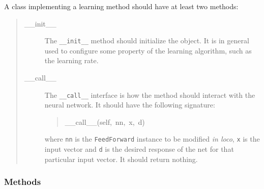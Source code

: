 A class implementing a learning method should have at least two methods:
%
\begin{quote}
%
\begin{description}
\item[{\_\_init\_\_}] \leavevmode 
The \texttt{\_\_init\_\_} method should initialize the object. It is in general
used to configure some property of the learning algorithm, such as the
learning rate.

\item[{\_\_call\_\_}] \leavevmode 
The \texttt{\_\_call\_\_} interface is how the method should interact with the
neural network. It should have the following signature:
%
\begin{quote}{\ttfamily \raggedright \noindent
\_\_call\_\_(self,~nn,~x,~d)
}
\end{quote}

where \texttt{nn} is the \texttt{FeedForward} instance to be modified \emph{in loco},
\texttt{x} is the input vector and \texttt{d} is the desired response of the net
for that particular input vector. It should return nothing.

\end{description}

\end{quote}


  \subsubsection{Methods}

    \label{peach:nn:lrules:FFLearning:__call__}

    \vspace{0.5ex}


